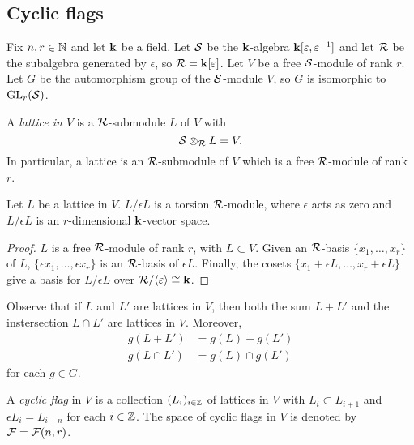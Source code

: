 \documentclass[a4paper, 11pt]{report}
\begin{document}
\subsection{Cyclic flags}

Fix $n,r\in\mathbb{N}$ and let $\mathbf{k}$ be a field. Let $\mathcal{S}$ be the $\mathbf{k}$-algebra $\mathbf{k}[\varepsilon,\varepsilon^{-1}]$ and let $\mathcal{R}$ be the subalgebra generated by $\epsilon$, so $\mathcal{R} = \mathbf{k}[\varepsilon]$. Let $V$ be a free $\mathcal{S}$-module of rank $r$. Let $G$ be the automorphism group of the $\mathcal{S}$-module $V$, so $G$ is isomorphic to $\operatorname{GL}_{r}(\mathcal{S})$.

\begin{definition}\label{definition:lattice}
A \emph{lattice in $V$} is a $\mathcal{R}$-submodule $L$ of $V$ with
\begin{equation*}
\mathcal{S}\otimes_{\mathcal{R}} L = V.
\end{equation*}
In particular, a lattice is an $\mathcal{R}$-submodule of $V$ which is a free $\mathcal{R}$-module of rank $r$.
\end{definition}

\begin{lemma}
Let $L$ be a lattice in $V$. $L/{\epsilon L}$ is a torsion $\mathcal{R}$-module, where $\epsilon$ acts as zero and $L/{\epsilon L}$ is an $r$-dimensional $\mathbf{k}$-vector space.
\end{lemma}

\begin{proof}
$L$ is a free $\mathcal{R}$-module of rank $r$, with $L\subset V$. Given an $\mathcal{R}$-basis $\{x_1,\ldots,x_r\}$ of $L$, $\{\epsilon x_1,\ldots, \epsilon x_r\}$ is an $\mathcal{R}$-basis of $\epsilon L$. Finally, the cosets $\{ x_1 + \epsilon L,\ldots, x_r + \epsilon L\}$ give a basis for $L/{\epsilon L}$ over $\mathcal{R}/{\langle \varepsilon\rangle}\cong \mathbf{k}$.
\end{proof}

Observe that if $L$ and $L'$ are lattices in $V$, then both the sum $L+L'$ and the instersection $L\cap L'$ are lattices in $V$. Moreover,
\begin{align*}
g(L+L') &= g(L) + g(L')\\
g(L\cap L') &= g(L)\cap g(L')
\end{align*}
for each $g\in G$.

\begin{definition}\label{definition:cyclic-flags}
A \emph{cyclic flag} in $V$ is a collection $(L_i)_{i\in\mathbb{Z}}$ of lattices in $V$ with $L_i\subset L_{i+1}$ and $\epsilon L_i = L_{i-n}$ for each $i\in\mathbb{Z}$. The space of cyclic flags in $V$ is denoted by $\mathcal{F}=\mathcal{F}(n,r)$.
\end{definition}
\end{document}

